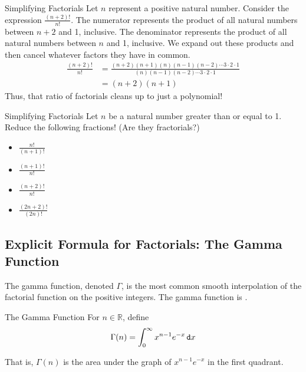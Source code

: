 \begin{example}{Simplifying Factorials}
Let $n$ represent a positive natural number. Consider the expression $\frac{(n+2)!}{n!}$.  The numerator represents the product of all natural numbers between $n+2$ and 1, inclusive.  The denominator represents the product of all natural numbers between $n$ and 1, inclusive.  We expand out these products and then cancel whatever factors they have in common.
\begin{align*}
\frac{(n+2)!}{n!}&=\frac{(n+2)(n+1)(n)(n-1)(n-2)\cdots 3\cdot 2 \cdot 1}{(n)(n-1)(n-2)\cdots 3\cdot 2 \cdot 1} \\
&=(n+2)(n+1)
\end{align*}
Thus, that ratio of factorials cleans up to just a polynomial!
\end{example}
\begin{exercise}{Simplifying Factorials \Coffeecup \Coffeecup} Let $n$ be a natural number greater than or equal to 1.  Reduce the following fractions! (Are they fractorials?) \begin{itemize}
\item $\frac{n!}{(n+1)!}$
\item $\frac{(n+1)!}{n!}$
\item $\frac{(n+2)!}{n!}$
\item $\frac{(2n+2)!}{(2n)!}$
\end{itemize} 
\end{exercise}
\subsection{Explicit Formula for Factorials: The Gamma Function}

The gamma function, denoted $\Gamma$, is the most common smooth interpolation of the factorial function on the positive integers.  The gamma function is .

\begin{definition}{The Gamma Function}
For $n\in\mathbb{R}$, define
 $$ \Gamma(n)= \int_{0}^\infty x^{n-1}e^{-x}\mathop{}\!\mathtt{d} x $$
\end{definition} 
That is, $\Gamma(n)$ is the area under the graph of $x^{n-1}e^{-x}$ in the first quadrant.

